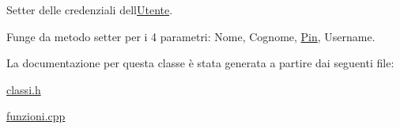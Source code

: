 Setter delle credenziali dell\textquotesingle{}\mbox{\hyperlink{class_utente}{Utente}}. 

Funge da metodo setter per i 4 parametri\+: Nome, Cognome, \mbox{\hyperlink{class_pin}{Pin}}, Username. 

La documentazione per questa classe è stata generata a partire dai seguenti file\+:\begin{DoxyCompactItemize}
\item 
\mbox{\hyperlink{classi_8h}{classi.\+h}}\item 
\mbox{\hyperlink{funzioni_8cpp}{funzioni.\+cpp}}\end{DoxyCompactItemize}
